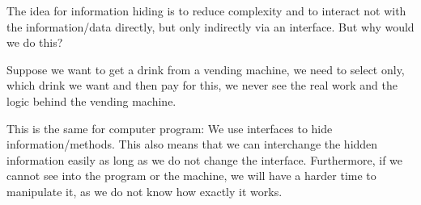 
The idea for information hiding is to reduce complexity and to interact not with the information/data directly,
but only indirectly via an interface. But why would we do this?

Suppose we want to get a drink from a vending machine,
we need to select only, which drink we want and then pay for this, we never see the real work and the logic behind the vending machine.

This is the same for computer program: We use interfaces to hide information/methods. This also means that we can interchange the hidden information easily as long as we do not change the interface. Furthermore, if we cannot see into the program or the machine, we will have a harder time to manipulate it, as we do not know how exactly it works.

